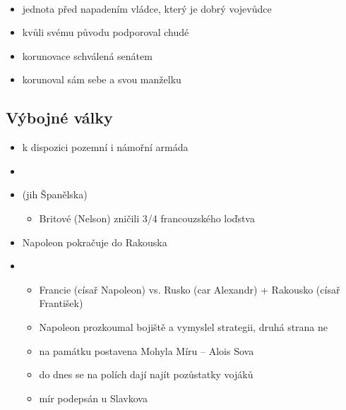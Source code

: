 \paragraph{}
\begin{itemize}
\item jednota před napadením \ra vládce, který je dobrý vojevůdce
\item kvůli svému původu podporoval chudé
\item korunovace schválená senátem
\item korunoval sám sebe a svou manželku
\end{itemize}

\subsection{Výbojné války}
\begin{itemize}
\item k dispozici pozemní i námořní armáda
\item {}
\item {} (jih Španělska)
	\begin{itemize}
	\item Britové (Nelson) zničili 3/4 francouzského loďstva
	\end{itemize}
\item Napoleon pokračuje do Rakouska
\item {}
	\begin{itemize}
	\item Francie (císař Napoleon) vs. Rusko (car Alexandr) + Rakousko (císař František)
	\item Napoleon prozkoumal bojiště a vymyslel strategii, druhá strana ne
	\item na památku postavena Mohyla Míru -- Alois Sova
	\item do dnes se na polích dají najít pozůstatky vojáků
	\item mír podepsán u Slavkova
	\end{itemize}
\end{itemize}

